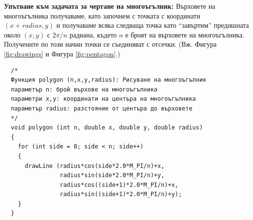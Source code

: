 {\begin{enumerate}[resume]
\begin{mdframed}[hidealllines=true,backgroundcolor=gray!20]
  \end{mdframed}
  
\begin{mdframed}[hidealllines=true,backgroundcolor=gray!20]

\textbf {Упътване към задачата за чертане на многоъгълник:} Върховете на многоъгълника получаваме, като започнем с точката с координати $(x+radius,y)$ и получаваме всяка следваща точка като ``завъртим'' предишната около $(x,y)$ с $2\pi/n$ радиана, където $n$ е броят на върховете на многоъгълника. Получените по този начин точки се съединяват с отсечки. (Вж. Фигура \ref{fig:drawings} и Фигура \ref{fig:pentagon}.)\\

  \begin{mdframed}[hidealllines=true,backgroundcolor=lightgray!20]
  \begin{verbatim}
  /*
  Функция polygon (n,x,y,radius): Рисуване на многоъгълник
  параметър n: брой върхове на многоъгълника
  параметри x,y: координати на центъра на многоъгълника
  параметър radius: разстояние от центъра до върховете
  */
  void polygon (int n, double x, double y, double radius)
  {
    for (int side = 0; side < n; side++)
    {
      drawLine (radius*cos(side*2.0*M_PI/n)+x,
                radius*sin(side*2.0*M_PI/n)+y,
                radius*cos((side+1)*2.0*M_PI/n)+x,
                radius*sin((side+1)*2.0*M_PI/n)+y);
    }
  }
  \end{verbatim}
  \end{mdframed}

\end{mdframed}



    \begin{figure}
    \centering

\end{figure}
\end{enumerate}}
